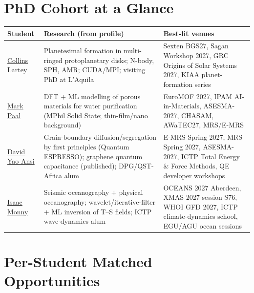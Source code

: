 \documentclass[11pt,a4paper]{article}
\begin{document}
\section{PhD Cohort at a Glance}

\begin{longtable}{@{}p{3.2cm}p{5.4cm}p{5.3cm}@{}}
\toprule
\textbf{Student} & \textbf{Research (from profile)} & \textbf{Best-fit venues} \\
\midrule
\endhead
\href{https://physics.knust.edu.gh/collins-lartey-phd}{Collins Lartey} & Planetesimal formation in multi-ringed protoplanetary disks; N-body, SPH, AMR; CUDA/MPI; visiting PhD at L'Aquila & Sexten BGS27, Sagan Workshop 2027, GRC Origins of Solar Systems 2027, KIAA planet-formation series \\
\midrule
\href{https://physics.knust.edu.gh/mark-paal-phd}{Mark Paal} & DFT $+$ ML modelling of porous materials for water purification (MPhil Solid State; thin-film/nano background) & EuroMOF 2027, IPAM AI-in-Materials, ASESMA-2027, CHASAM, AWaTEC27, MRS/E-MRS \\
\midrule
\href{https://physics.knust.edu.gh/david-yao-ansi-phd}{David Yao Ansi} & Grain-boundary diffusion/segregation by first principles (Quantum ESPRESSO); graphene quantum capacitance (published); DPG/QST-Africa alum & E-MRS Spring 2027, MRS Spring 2027, ASESMA-2027, ICTP Total Energy \& Force Methods, QE developer workshops \\
\midrule
\href{https://physics.knust.edu.gh/isaac-monny-phd}{Isaac Monny} & Seismic oceanography $+$ physical oceanography; wavelet/iterative-filter $+$ ML inversion of T--S fields; ICTP wave-dynamics alum & OCEANS 2027 Aberdeen, XMAS 2027 session S76, WHOI GFD 2027, ICTP climate-dynamics school, EGU/AGU ocean sessions \\
\bottomrule
\end{longtable}

\section{Per-Student Matched Opportunities}
\end{document}
